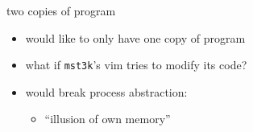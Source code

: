 \begin{frame}{two copies of program}
\begin{itemize}
\item would like to only have one copy of program
\vspace{.5cm}
\item what if {\tt mst3k}'s vim tries to modify its code?
\item would break process abstraction:
    \begin{itemize}
        \item ``illusion of own memory''
    \end{itemize}
\end{itemize}
\end{frame}
